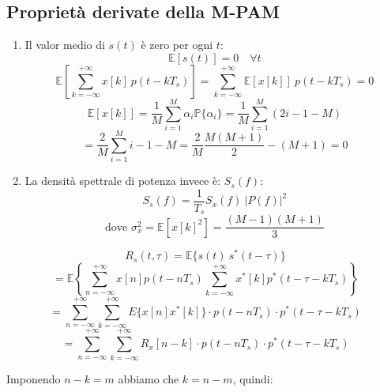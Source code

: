 \subsection*{Proprietà derivate della M-PAM}
\begin{enumerate}
    \item Il valor medio di \( s(t) \) è zero per ogni \( t \):
          \begin{equation*}
              \mathbb{E}\left[ s(t) \right] = 0 \quad \forall t
          \end{equation*}
          \begin{equation*}
              \mathbb{E} \left[ \sum_{k=-\infty}^{+\infty} x[k] \ p(t-kT_s) \right] = \sum_{k=-\infty}^{+\infty} \mathbb{E}\left[x[k]\right]\ p(t-kT_s) = 0
          \end{equation*}
          \begin{equation*}
              \mathbb{E}\left[x[k]\right] = \frac{1}{M} \sum_{i=1}^{M} \alpha_i \mathbb{P}\{\alpha_i\} = \frac{1}{M} \sum_{i=1}^{M} (2i - 1 - M)
          \end{equation*}
          \begin{equation*}
              = \frac{2}{M} \sum_{i=1}^{M} i - 1 - M = \frac{2}{M} \frac{M(M+1)}{2} - (M+1) = 0
          \end{equation*}

    \item La densità spettrale di potenza invece è: \( S_s(f) \):
          \begin{equation*}
              S_s(f) = \frac{1}{T_s} S_x(f) \ |P(f)|^2
          \end{equation*}
          \begin{equation*}
              \text{dove } \sigma_x^2 = \mathbb{E}\left[ x\left[k\right]^2 \right] = \frac{(M-1)(M+1)}{3}
          \end{equation*}
\end{enumerate}

\[
    R_s(t,\tau) = \mathbb{E}\{s(t) \ s^*(t-\tau)\}
\]
\[
    = \mathbb{E} \left\{ \sum_{n=-\infty}^{+\infty} x\left[n\right] p(t - nT_s) \sum_{k=-\infty}^{+\infty} x^*\left[k\right] p^*(t - \tau - kT_s) \right\}
\]
\[
    = \sum_{n=-\infty}^{+\infty} \sum_{k=-\infty}^{+\infty} E\{x\left[n\right] x^*\left[k\right]\} \cdot p(t - nT_s) \cdot p^*(t - \tau - kT_s)
\]
\[
    = \sum_{n=-\infty}^{+\infty} \sum_{k=-\infty}^{+\infty} R_x\left[n-k\right] \cdot p(t - nT_s) \cdot p^*(t - \tau - kT_s)
\]

Imponendo \( n-k = m \) abbiamo che \( k = n-m \), quindi:

